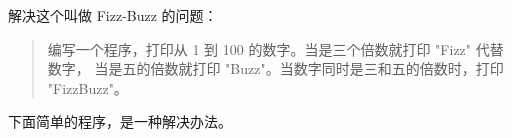 \begin{Exercise}[title={FizzBuzz},difficulty=1]
\label{ex:fizzbuzz}
\Question \label{ex:fizzbuzz q1} 解决这个叫做 Fizz-Buzz \cite{fizzbuzz} 的问题：
\begin{quote}
编写一个程序，打印从 1 到 100 的数字。当是三个倍数就打印 "Fizz" 代替数字，
当是五的倍数就打印 "Buzz"。当数字同时是三和五的倍数时，打印 "FizzBuzz"。
\end{quote}
\end{Exercise}

\begin{Answer}
\Question 下面简单的程序，是一种解决办法。

\showremarks
\end{Answer}
